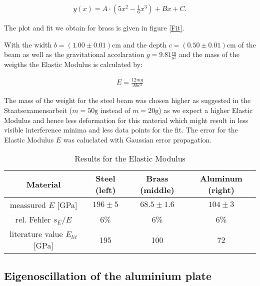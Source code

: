\begin{align*}
y(x)=A\cdot\left(5x^2-\frac{1}{6}x^3\right)+Bx+C .
\end{align*}  

The plot and fit we obtain for brass is given in figure \ref{Fit}.



With the width  $b=(1.00\pm0.01)\mathrm{cm}$ and the depth  $c=(0.50\pm0.01)\mathrm{cm}$ of the beam as well as the gravitational accelaration $g=9.81\frac{\mathrm{m}}{\mathrm{s}^2}$ and the mass of the weigths the Elastic Modulus is calculated by: 

\begin{align}
E=\frac{12mg}{Abc^3}
\end{align}

The mass of the weight for the steel beam was chosen higher as suggested in the Staatsexamensarbeit \cite{staats} ($m=50\mathrm{g}$ instead of $m=20\mathrm{g}$) as we expect a higher Elastic Modulus and hence less deformation for this material  which might result in less visible interference minima and less data points for the fit.
The error for the Elastic Modulus $E$ was caluclated with Gaussian error propagation.

\begin{table}[h!]
	\centering
	\begin{tabular}{c|c|c|c}
		Material							& Steel (left)	& Brass (middle)	& Aluminum (right)\\ \hline\hline
		meassured $E$ [GPa]			& $196\pm5$	& $68.5\pm1.6$			& $104\pm3$			\\ \hline
		rel. Fehler $s_E/E$				& $6$\%			& $6$\%				& $6$\%				\\ \hline
	literature value \cite{staat} $E_{lit}$ [GPa]	& 195			& 100				& 72
	\end{tabular}
	\caption{Results for the Elastic Modulus}
\end{table}

\subsection{Eigenoscillation of the aluminium plate}

